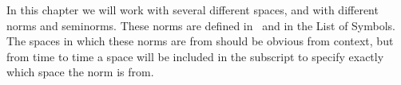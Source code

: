 In this chapter we will work with several different spaces, and with different norms and 
seminorms. 
These norms are defined in~\cite{Braess} and in the List of Symbols. 
The spaces in which these norms are from should be obvious from context, but from 
time to time a space will be included in the subscript to specify exactly which 
space the norm is from.